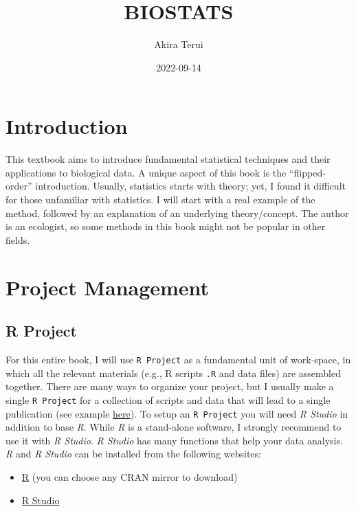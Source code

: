 \documentclass[
]{book}
\title{BIOSTATS}
\author{Akira Terui}
\date{2022-09-14}
\providecommand{\tightlist}{%
  \setlength{\itemsep}{0pt}\setlength{\parskip}{0pt}}
\begin{document}
\maketitle

{
\setcounter{tocdepth}{1}
\tableofcontents
}
\hypertarget{introduction}{%
\chapter{Introduction}\label{introduction}}

This textbook aims to introduce fundamental statistical techniques and their applications to biological data. A unique aspect of this book is the ``flipped-order'' introduction. Usually, statistics starts with theory; yet, I found it difficult for those unfamiliar with statistics. I will start with a real example of the method, followed by an explanation of an underlying theory/concept. The author is an ecologist, so some methods in this book might not be popular in other fields.

\hypertarget{project-management}{%
\chapter{Project Management}\label{project-management}}

\hypertarget{r-project}{%
\section{R Project}\label{r-project}}

For this entire book, I will use \texttt{R\ Project} as a fundamental unit of work-space, in which all the relevant materials (e.g., R scripts \texttt{.R} and data files) are assembled together. There are many ways to organize your project, but I usually make a single \texttt{R\ Project} for a collection of scripts and data that will lead to a single publication (see example \href{https://github.com/aterui/public-proj_stream-diversity}{here}). To setup an \texttt{R\ Project} you will need \emph{R Studio} in addition to base \emph{R}. While \emph{R} is a stand-alone software, I strongly recommend to use it with \emph{R Studio}. \emph{R Studio} has many functions that help your data analysis. \emph{R} and \emph{R Studio} can be installed from the following websites:

\begin{itemize}
\tightlist
\item
  \href{https://www.r-project.org/}{R} (you can choose any CRAN mirror to download)
\item
  \href{https://rStudio.com/products/rStudio/download/}{R Studio}
\end{itemize}
\end{document}
